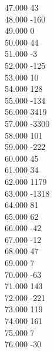 { 47.000	43 \\
 48.000	-160 \\
 49.000	0 \\
 50.000	44 \\
 51.000	-3 \\
 52.000	-125 \\
 53.000	10 \\
 54.000	128 \\
 55.000	-134 \\
 56.000	3419 \\
 57.000	-3300 \\
 58.000	101 \\
 59.000	-222 \\
 60.000	45 \\
 61.000	34 \\
 62.000	1179 \\
 63.000	-1318 \\
 64.000	81 \\
 65.000	62 \\
 66.000	-42 \\
 67.000	-12 \\
 68.000	47 \\
 69.000	7 \\
 70.000	-63 \\
 71.000	143 \\
 72.000	-221 \\
 73.000	119 \\
 74.000	161 \\
 75.000	7 \\
 76.000	-30 \\
}
